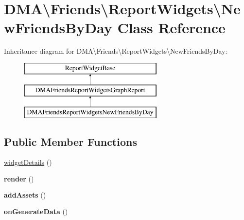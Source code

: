 \hypertarget{classDMA_1_1Friends_1_1ReportWidgets_1_1NewFriendsByDay}{}\section{D\+M\+A\textbackslash{}Friends\textbackslash{}Report\+Widgets\textbackslash{}New\+Friends\+By\+Day Class Reference}
\label{classDMA_1_1Friends_1_1ReportWidgets_1_1NewFriendsByDay}
Inheritance diagram for D\+M\+A\textbackslash{}Friends\textbackslash{}Report\+Widgets\textbackslash{}New\+Friends\+By\+Day\+:\begin{figure}[H]
\begin{center}
\leavevmode
\includegraphics[height=3.000000cm]{d1/d95/classDMA_1_1Friends_1_1ReportWidgets_1_1NewFriendsByDay}
\end{center}
\end{figure}
\subsection*{Public Member Functions}
\begin{DoxyCompactItemize}
\item 
\hyperlink{classDMA_1_1Friends_1_1ReportWidgets_1_1NewFriendsByDay_a950b5b67fab1a9ee67ba549fb43020b5}{widget\+Details} ()
\item 
\hypertarget{classDMA_1_1Friends_1_1ReportWidgets_1_1NewFriendsByDay_a50b7456b3aea8c75b16bc220a34aa477}{}{\bfseries render} ()\label{classDMA_1_1Friends_1_1ReportWidgets_1_1NewFriendsByDay_a50b7456b3aea8c75b16bc220a34aa477}

\item 
\hypertarget{classDMA_1_1Friends_1_1ReportWidgets_1_1NewFriendsByDay_aa55400ec9bec4ec0fdb59879559b365b}{}{\bfseries add\+Assets} ()\label{classDMA_1_1Friends_1_1ReportWidgets_1_1NewFriendsByDay_aa55400ec9bec4ec0fdb59879559b365b}

\item 
\hypertarget{classDMA_1_1Friends_1_1ReportWidgets_1_1NewFriendsByDay_adb2f3f49b49d43a0d64ddf229204567b}{}{\bfseries on\+Generate\+Data} ()\label{classDMA_1_1Friends_1_1ReportWidgets_1_1NewFriendsByDay_adb2f3f49b49d43a0d64ddf229204567b}

\end{DoxyCompactItemize}
